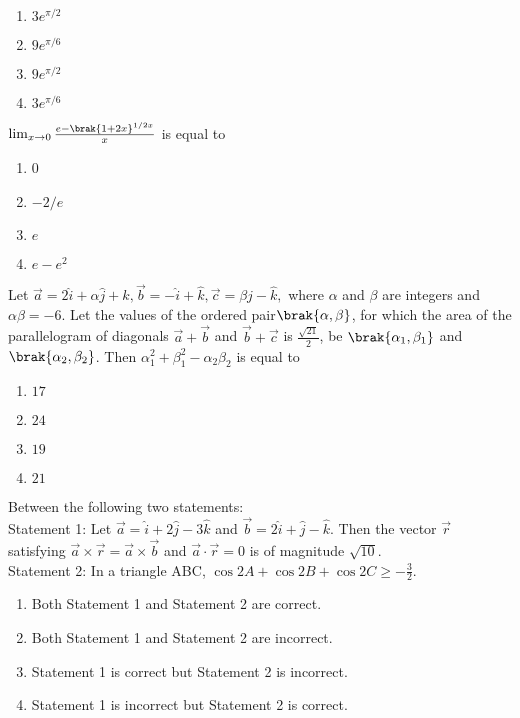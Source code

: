    \begin{enumerate}
        \item $3e^{\pi/2}$
        \item $9e^{\pi/6}$
        \item $9e^{\pi/2}$
        \item $3e^{\pi/6}$
    \end{enumerate}
    \item $\lim_{x \to 0} \frac{e-\brak{1+2x}^{1/2x}}{x}$ is equal to
    \begin{enumerate}
        \item 0
        \item $-2/e$
        \item $e$
        \item $e-e^2$
    \end{enumerate}
    \item Let $\vec{a} = 2\hat{i} + \alpha\hat{j} + \hat{k}, \vec{b} = -\hat{i} + \hat{k}, \vec{c}=\beta\hat{j}-\hat{k},$ where $\alpha$ and $\beta$ are integers and $\alpha\beta=-6$. Let the values of the ordered pair$\brak{\alpha,\beta}$, for which the area of the parallelogram of diagonals $\vec{a}+\vec{b}$ and $\vec{b}+\vec{c}$ is $\frac{\sqrt{21}}{2}$, be $\brak{\alpha_1,\beta_1}$ and $\brak{\alpha_2,\beta_2}$. Then $\alpha_1^2+\beta_1^2-\alpha_2\beta_2$ is equal to
    \begin{enumerate}
        \item $17$
        \item $24$
        \item $19$
        \item $21$
    \end{enumerate}
    \item Between the following two statements:\\
    Statement 1: Let $\vec{a}=\hat{i}+2\hat{j}-3\hat{k}$ and $\vec{b}=2\hat{i}+\hat{j}-\hat{k}$. Then the vector $\vec{r}$ satisfying $\vec{a}\times\vec{r}=\vec{a}\times\vec{b}$ and $\vec{a}\cdot\vec{r}=0$ is of magnitude $\sqrt{10}$.\\
    Statement 2: In a triangle ABC, $\cos{2A}+\cos{2B}+\cos{2C}\geq -\frac{3}{2}.$
    \begin{enumerate}
        \item Both Statement 1 and Statement 2 are correct.
        \item Both Statement 1 and Statement 2 are incorrect.
        \item Statement 1 is correct but Statement 2 is incorrect.
        \item Statement 1 is incorrect but Statement 2 is correct.
    \end{enumerate}

